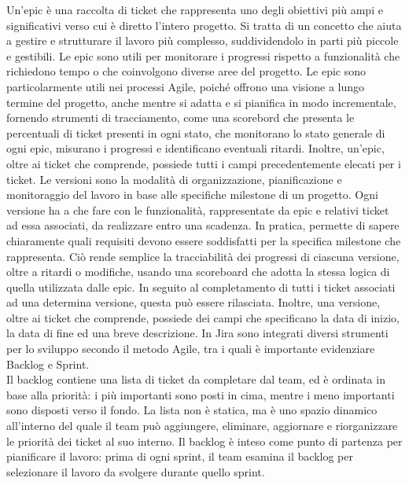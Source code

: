 Un'epic è una raccolta di ticket che rappresenta uno degli obiettivi più ampi e significativi verso cui è diretto l'intero progetto. Si tratta di un concetto che aiuta a gestire e strutturare il lavoro più complesso, suddividendolo in parti più piccole e gestibili. Le epic sono utili per monitorare i progressi rispetto a funzionalità che richiedono tempo o che coinvolgono diverse aree del progetto. Le epic sono particolarmente utili nei processi Agile, poiché offrono una visione a lungo termine del progetto, anche mentre si adatta e si pianifica in modo incrementale, fornendo strumenti di tracciamento, come una scorebord che presenta le percentuali di ticket presenti in ogni stato, che monitorano lo stato generale di ogni epic, misurano i progressi e identificano eventuali ritardi. Inoltre, un'epic, oltre ai ticket che comprende, possiede tutti i campi precedentemente elecati per i ticket.
Le versioni sono la modalità di organizzazione, pianificazione e monitoraggio del lavoro in base alle specifiche milestone di un progetto. Ogni versione ha a che fare con le funzionalità, rappresentate da epic e relativi ticket ad essa associati, da realizzare entro una scadenza. In pratica, permette di sapere chiaramente quali requisiti devono essere soddisfatti per la specifica milestone che rappresenta. Ciò rende semplice la tracciabilità dei progressi di ciascuna versione, oltre a ritardi o modifiche, usando una scoreboard che adotta la stessa logica di quella utilizzata dalle epic. In seguito al completamento di tutti i ticket associati ad una determina versione, questa può essere rilasciata. Inoltre, una versione, oltre ai ticket che comprende, possiede dei campi che specificano la data di inizio, la data di fine ed una breve descrizione.
In Jira sono integrati diversi strumenti per lo sviluppo secondo il metodo Agile, tra i quali è importante evidenziare Backlog e Sprint.\\
Il backlog contiene una lista di ticket da completare dal team, ed è ordinata in base alla priorità: i più importanti sono posti in cima, mentre i meno importanti sono disposti verso il fondo. La lista non è statica, ma è uno spazio dinamico all'interno del quale il team può aggiungere, eliminare, aggiornare e riorganizzare le priorità dei ticket al suo interno. Il backlog è inteso come punto di partenza per pianificare il lavoro: prima di ogni sprint, il team esamina il backlog per selezionare il lavoro da svolgere durante quello sprint.\\
